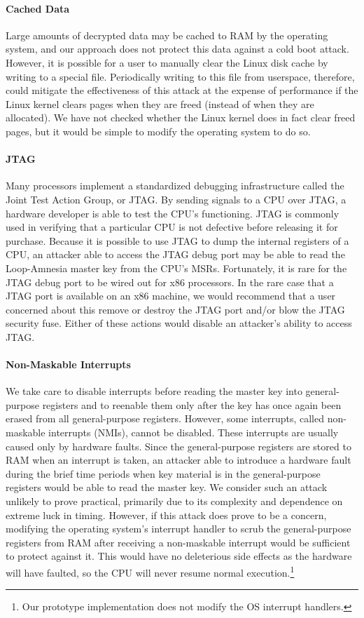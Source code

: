 \documentclass[letterpaper,twocolumn,nonatbib,10pt]{article}
\begin{document}
\paragraph{Cached Data}
Large amounts of decrypted data may be cached to RAM by the operating
system, and our approach does not protect this data against a cold
boot attack.  However, it is possible for a user to manually clear the
Linux disk cache by writing to a special file\cite{dropcache}.
Periodically writing to this file from userspace, therefore, could
mitigate the effectiveness of this attack at the expense of
performance if the Linux kernel clears pages when they are freed
(instead of when they are allocated).  We have not checked whether the
Linux kernel does in fact clear freed pages, but it would be simple to
modify the operating system to do so.

\paragraph{JTAG}
Many processors implement a standardized debugging infrastructure
called the Joint Test Action Group, or JTAG.  By sending signals to a
CPU over JTAG, a hardware developer is able to test the CPU's
functioning.  JTAG is commonly used in verifying that a particular CPU
is not defective before releasing it for purchase.  Because it is
possible to use JTAG to dump the internal registers of a CPU, an
attacker able to access the JTAG debug port may be able to read the
Loop-Amnesia master key from the CPU's MSRs.  Fortunately, it is rare
for the JTAG debug port to be wired out for x86 processors\cite{celf}.
In the rare case that a JTAG port is available on an x86 machine, we
would recommend that a user concerned about this remove or destroy the
JTAG port and/or blow the JTAG security fuse.  Either of these actions
would disable an attacker's ability to access JTAG\cite{jtagfuse}.

\paragraph{Non-Maskable Interrupts}
\label{nmi}
We take care to disable interrupts before reading the master key into
general-purpose registers and to reenable them only after the key has
once again been erased from all general-purpose registers.  However,
some interrupts, called non-maskable interrupts (NMIs), cannot be
disabled.  These interrupts are usually caused only by hardware
faults.  Since the general-purpose registers are stored to RAM when an
interrupt is taken, an attacker able to introduce a hardware fault
during the brief time periods when key material is in the
general-purpose registers would be able to read the master key.  We
consider such an attack unlikely to prove practical, primarily due to
its complexity and dependence on extreme luck in timing.  However, if
this attack does prove to be a concern, modifying the operating
system's interrupt handler to scrub the general-purpose registers from
RAM after receiving a non-maskable interrupt would be sufficient to
protect against it.  This would have no deleterious side effects as
the hardware will have faulted, so the CPU will never resume normal
execution.\footnote{Our prototype implementation does not modify the
  OS interrupt handlers.}
\end{document}
